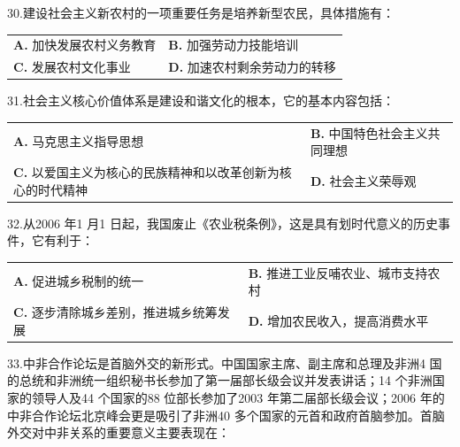 \documentclass[UTF8,11pt]{ctexart}
\begin{document}
30.建设社会主义新农村的一项重要任务是培养新型农民，具体措施有：


\begin{center}\begin{tabular}{>{\raggedright\arraybackslash}p{\dimexpr(\linewidth-4\tabcolsep)/2\relax}>{\raggedright\arraybackslash}p{\dimexpr(\linewidth-4\tabcolsep)/2\relax}}
\textbf{A.} 加快发展农村义务教育 & \textbf{B.} 加强劳动力技能培训\\[.35em]
\textbf{C.} 发展农村文化事业 & \textbf{D.} 加速农村剩余劳动力的转移\\[.35em]\end{tabular}\end{center}

31.社会主义核心价值体系是建设和谐文化的根本，它的基本内容包括：


\begin{center}\begin{tabular}{>{\raggedright\arraybackslash}p{\dimexpr(\linewidth-4\tabcolsep)/2\relax}>{\raggedright\arraybackslash}p{\dimexpr(\linewidth-4\tabcolsep)/2\relax}}
\textbf{A.} 马克思主义指导思想 & \textbf{B.} 中国特色社会主义共同理想\\[.35em]
\textbf{C.} 以爱国主义为核心的民族精神和以改革创新为核心的时代精神 & \textbf{D.} 社会主义荣辱观\\[.35em]\end{tabular}\end{center}

32.从2006 年1 月1 日起，我国废止《农业税条例》，这是具有划时代意义的历史事件，它有利于：


\begin{center}\begin{tabular}{>{\raggedright\arraybackslash}p{\dimexpr(\linewidth-4\tabcolsep)/2\relax}>{\raggedright\arraybackslash}p{\dimexpr(\linewidth-4\tabcolsep)/2\relax}}
\textbf{A.} 促进城乡税制的统一 & \textbf{B.} 推进工业反哺农业、城市支持农村\\[.35em]
\textbf{C.} 逐步清除城乡差别，推进城乡统筹发展 & \textbf{D.} 增加农民收入，提高消费水平\\[.35em]\end{tabular}\end{center}

33.中非合作论坛是首脑外交的新形式。中国国家主席、副主席和总理及非洲4 国的总统和非洲统一组织秘书长参加了第一届部长级会议并发表讲话；14 个非洲国家的领导人及44 个国家的88 位部长参加了2003 年第二届部长级会议；2006 年的中非合作论坛北京峰会更是吸引了非洲40 多个国家的元首和政府首脑参加。首脑外交对中非关系的重要意义主要表现在：
\end{document}
